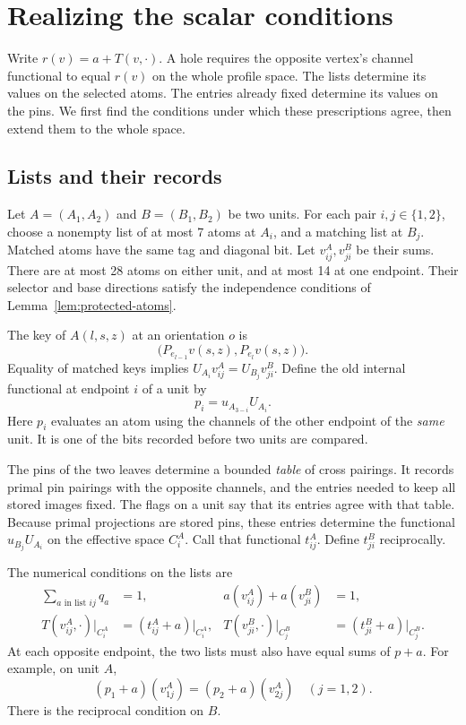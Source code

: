 \section{Realizing the scalar conditions}\label{sec:realization}

Write \(r(v)=a+T(v,\cdot)\). A hole requires the opposite vertex's
channel functional to equal \(r(v)\) on the whole profile space.
The lists determine its values on the selected atoms. The entries
already fixed determine its values on the pins. We first find the
conditions under which these prescriptions agree, then extend them
to the whole space.

\subsection{Lists and their records}

Let \(A=(A_1,A_2)\) and \(B=(B_1,B_2)\) be two units. For each pair
\(i,j\in\{1,2\}\), choose a nonempty list of at most 7 atoms at
\(A_i\), and a matching list at \(B_j\). Matched atoms have the same
tag and diagonal bit. Let \(v^A_{ij},v^B_{ji}\) be their sums.
There are at most 28 atoms on either unit, and at most 14 at one endpoint.
Their selector and base directions satisfy the independence conditions
of Lemma~\ref{lem:protected-atoms}.

The key of \(A(l,s,z)\) at an orientation \(o\) is
\[
 \bigl(P_{e_{l-1}}v(s,z),P_{e_l}v(s,z)\bigr).
\]
Equality of matched keys implies
\(U_{A_i}v^A_{ij}=U_{B_j}v^B_{ji}\).
Define the old internal functional at endpoint \(i\) of a unit by
\[
 p_i=u_{A_{3-i}}U_{A_i}.
\]
Here \(p_i\) evaluates an atom using the channels of the other
endpoint of the \emph{same} unit. It is one of the bits recorded before
two units are compared.

The pins of the two leaves determine a bounded \emph{table} of cross
pairings. It records primal pin pairings with the opposite channels, and
the entries needed to keep all stored images fixed. The flags on a unit
say that its entries agree with that table. Because primal projections
are stored pins, these entries determine the functional
\(u_{B_j}U_{A_i}\) on the effective space \(C_i^A\).
Call that functional \(t^A_{ij}\). Define \(t^B_{ji}\) reciprocally.

The numerical conditions on the lists are
\begin{align}
 \sum_{a\text{ in list }ij}q_a&=1,
 &a(v^A_{ij})+a(v^B_{ji})&=1,\label{eq:recipe-scalars}\\
 T(v^A_{ij},\cdot)|_{C_i^A}&=(t^A_{ij}+a)|_{C_i^A},
 &T(v^B_{ji},\cdot)|_{C_j^B}&=(t^B_{ji}+a)|_{C_j^B}.
 \label{eq:recipe-gradients}
\end{align}
At each opposite endpoint, the two lists must also have equal sums of
\(p+a\). For example, on unit \(A\),
\begin{equation}\label{eq:recipe-balance}
 (p_1+a)(v^A_{1j})=(p_2+a)(v^A_{2j})\quad(j=1,2).
\end{equation}
There is the reciprocal condition on \(B\).

